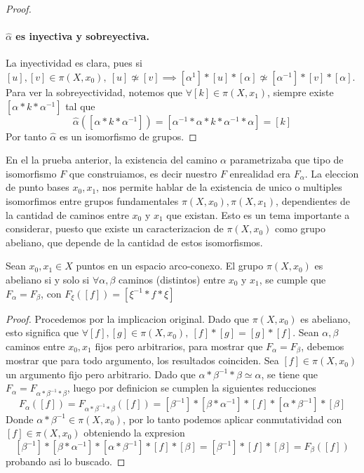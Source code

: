 {\begin{proof}
  \paragraph{\(\hat \alpha\) es inyectiva y sobreyectiva.} La inyectividad es
  clara, pues si \([u],[v] \in \pi (X, x_0),\ [u] \not \simeq [v]
  \implies [\alpha^{1}] * [u] * [\alpha] \not \simeq [\alpha^{-1}] * [v]
  * [\alpha]\). Para ver la sobreyectividad, notemos que \(\forall [k] \in
  \pi (X, x_1) \), siempre existe \( [\alpha * k * \alpha^{-1}]\) tal
  que
  \[ \hat \alpha ([\alpha * k * \alpha^{-1}]) = [\alpha^{-1} * \alpha * k *
    \alpha^{-1} * \alpha] = [k]\]
  Por tanto \(\hat \alpha\) es un isomorfismo de grupos.
\end{proof}
En el la prueba anterior, la existencia del camino \(\alpha\)
parametrizaba que tipo de isomorfismo \(F\) que construiamos, es decir
nuestro \(F\) enrealidad era \(F_{\alpha}\). La eleccion de punto bases
\(x_0, x_1\), nos permite hablar de la existencia de unico o multiples
isomorfimos entre grupos fundamentales \(\pi (X, x_0), \pi (X, x_1) \),
dependientes de la cantidad de caminos entre \(x_0\) y \(x_1\) que
existan. Esto es un tema importante a considerar, puesto que existe un
caracterizacion de \(\pi (X, x_0) \) como grupo abeliano, que depende de
la cantidad de estos isomorfismos.
\begin{teorema}
  Sean \(x_0, x_1 \in X\) puntos en un espacio arco-conexo. El grupo
  \(\pi (X, x_0) \) es abeliano si y solo si \(\forall \alpha, \beta\)
  caminos (distintos) entre \(x_0\) y \(x_1\), se cumple que \(F_\alpha =
  F_\beta\), con \(F_{\xi} ([f]) = [\xi^{-1} * f * \xi] \)
\end{teorema}
\begin{proof}
  Procedemos por la implicacion original. Dado que \(\pi (X, x_0)\) es
  abeliano, esto significa que \(\forall [f],[g] \in \pi (X, x_0),\ [f]
  * [g] = [g] * [f]\). Sean \(\alpha, \beta\) caminos entre \(x_0,x_1\)
  fijos pero arbitrarios, para mostrar que \(F_\alpha = F_\beta\),
  debemos mostrar que para todo argumento, los resultados coinciden. Sea
  \([f] \in \pi (X, x_0) \) un argumento fijo pero arbitrario. Dado que
  \(\alpha * \beta^{-1} * \beta \simeq \alpha \), se tiene que
  \(F_\alpha = F _{\alpha * \beta^{-1} * \beta}\), luego por definicion
  se cumplen la siguientes reducciones
  \[ F_\alpha ([f]) = F_{\alpha * \beta^{-1} * \beta} ([f]) =
    [\beta^{-1}] * [\beta * \alpha^{-1}] * [f] * [\alpha * \beta^{-1}]
    * [\beta] \]
  Donde \(\alpha * \beta^{-1} \in \pi (X, x_0) \), por lo tanto podemos
  aplicar conmutatividad con \([f] \in \pi (X,x_0)\) obteniendo la expresion
  \[ [\beta^{-1}] * [\beta * \alpha^{-1}] * [\alpha * \beta^{-1}] * [f]
    * [\beta] = [\beta^{-1}] * [f] * [\beta] = F_\beta ([f]) \]
  probando asi lo buscado.


\end{proof}}
